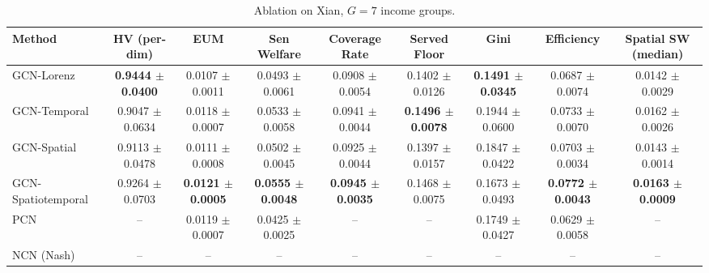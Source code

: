 \begin{table}[htbp]
\centering
\caption{Ablation on Xian, $G=7$ income groups.}
\label{tab:ablation_xian_g7}
\begin{tabular}{lcccccccc}
\toprule
Method & HV (per-dim) & EUM & Sen Welfare & Coverage Rate & Served Floor & Gini & Efficiency & Spatial SW (median) \\
\midrule
GCN-Lorenz & \textbf{0.9444 $\pm$ 0.0400} & 0.0107 $\pm$ 0.0011 & 0.0493 $\pm$ 0.0061 & 0.0908 $\pm$ 0.0054 & 0.1402 $\pm$ 0.0126 & \textbf{0.1491 $\pm$ 0.0345} & 0.0687 $\pm$ 0.0074 & 0.0142 $\pm$ 0.0029 \\
GCN-Temporal & 0.9047 $\pm$ 0.0634 & 0.0118 $\pm$ 0.0007 & 0.0533 $\pm$ 0.0058 & 0.0941 $\pm$ 0.0044 & \textbf{0.1496 $\pm$ 0.0078} & 0.1944 $\pm$ 0.0600 & 0.0733 $\pm$ 0.0070 & 0.0162 $\pm$ 0.0026 \\
GCN-Spatial & 0.9113 $\pm$ 0.0478 & 0.0111 $\pm$ 0.0008 & 0.0502 $\pm$ 0.0045 & 0.0925 $\pm$ 0.0044 & 0.1397 $\pm$ 0.0157 & 0.1847 $\pm$ 0.0422 & 0.0703 $\pm$ 0.0034 & 0.0143 $\pm$ 0.0014 \\
GCN-Spatiotemporal & 0.9264 $\pm$ 0.0703 & \textbf{0.0121 $\pm$ 0.0005} & \textbf{0.0555 $\pm$ 0.0048} & \textbf{0.0945 $\pm$ 0.0035} & 0.1468 $\pm$ 0.0075 & 0.1673 $\pm$ 0.0493 & \textbf{0.0772 $\pm$ 0.0043} & \textbf{0.0163 $\pm$ 0.0009} \\
PCN & -- & 0.0119 $\pm$ 0.0007 & 0.0425 $\pm$ 0.0025 & -- & -- & 0.1749 $\pm$ 0.0427 & 0.0629 $\pm$ 0.0058 & -- \\
NCN (Nash) & -- & -- & -- & -- & -- & -- & -- & -- \\
\bottomrule
\end{tabular}
\end{table}


